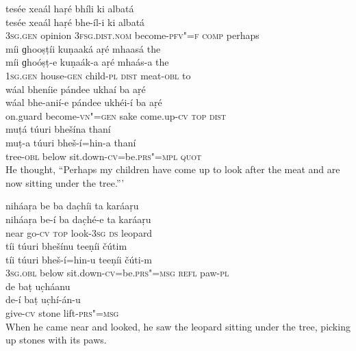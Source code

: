 \begin{exe}
\ex
\label{ex:11}
\glll tesée	xeaál	haṛé	bhíli	ki	albatá \\
tesée	xeaál	haṛé	bhe-íl-i	ki	albatá \\
\textsc{3sg.gen}	opinion \textsc{3fsg.dist.nom}	become-\textsc{pfv"=f} \textsc{comp}	perhaps \\
\glll míi	ɡhooṣṭíi	kuṇaaká	aṛé	mhaasá	the \\
míi	ɡhoóṣṭ-e	kuṇaák-a	aṛé	mhaás-a	the \\
\textsc{1sg.gen}	house-\textsc{gen}	child-\textsc{pl} \textsc{dist}	meat-\textsc{obl}	to \\
\glll wáal	bheníie	pándee	ukhaí	ba	aṛé \\
wáal	bhe-anií-e	pándee	ukhéi-í	ba	aṛé \\
on.guard	become-\textsc{vn"=gen}	sake	come.up-\textsc{cv} \textsc{top} \textsc{dist} \\
\glll muṭá	túuri	bhešína	thaní \\
muṭ-a	túuri	bheš-í=hin-a	thaní \\
tree-\textsc{obl}	below	sit.down-\textsc{cv}=be.\textsc{prs"=mpl} 	\textsc{quot} \\
\glt He thought, “Perhaps my children have come up to look after the meat and are now sitting under the tree.”'

\ex
\label{ex:12}
\glll niháaṛa	be	ba	dac̣híi	ta	karáaṛu \\
niháaṛa	be-í	ba	dac̣hé-e	ta	karáaṛu \\
near	go-\textsc{cv} \textsc{top}	look-\textsc{3sg} \textsc{ds}	leopard \\
\glll tíi	túuri	bhešínu	teeṇíi	čútim \\
tíi	túuri	bheš-í=hin-u	teeṇíi	čúti-m \\
\textsc{3sg.obl}	below	sit.down-\textsc{cv}=be.\textsc{prs"=msg } \textsc{refl}	paw-\textsc{pl} \\
\glll de	baṭ	uc̣háanu \\
de-í	baṭ	uc̣hí-án-u \\
give-\textsc{cv}	stone	lift-\textsc{prs"=msg} \\
\glt When he came near and looked, he saw the leopard sitting under the tree, picking up stones with its paws.


\end{exe}
